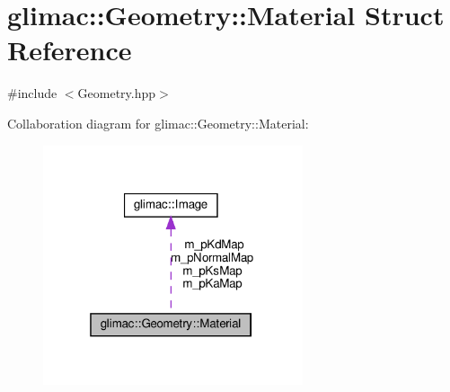 \hypertarget{structglimac_1_1_geometry_1_1_material}{}\section{glimac\+:\+:Geometry\+:\+:Material Struct Reference}
\label{structglimac_1_1_geometry_1_1_material}


{\ttfamily \#include $<$Geometry.\+hpp$>$}



Collaboration diagram for glimac\+:\+:Geometry\+:\+:Material\+:\nopagebreak
\begin{figure}[H]
\begin{center}
\leavevmode
\includegraphics[width=217pt]{structglimac_1_1_geometry_1_1_material__coll__graph}
\end{center}
\end{figure}
